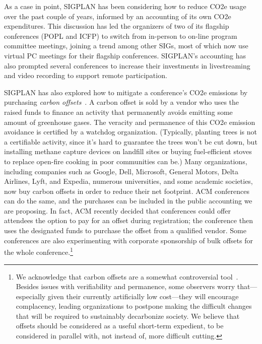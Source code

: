 \documentclass[12pt]{article}
\newcommand{\mwh}[1]{\ifdraft{\bf [mwh: #1]}\fi}
\begin{document}
As a case in point, SIGPLAN has been considering how to reduce CO2e usage
over the past couple of years, informed by an accounting of its own CO2e
expenditures. This discussion has led the organizers of two of its flagship
conferences (POPL and ICFP) to switch from in-person to on-line program
committee meetings, joining a trend among other SIGs, most of which now use
virtual PC meetings for their flagship conferences. SIGPLAN's accounting has
also prompted several conferences to increase their investments in
livestreaming and video recording to support remote participation.

SIGPLAN has also explored how to mitigate a conference's CO2e emissions by
purchasing \emph{carbon offsets}~\cite{CarbonOFfsetReport}.
%
A carbon offset is sold by a vendor who uses the raised funds to finance an
activity that permanently avoids emitting some amount of greenhouse gases.
The veracity and permanence of this CO2e emission avoidance is certified by
a watchdog organization. (Typically, planting trees is not a certifiable
activity, since it's hard to guarantee the trees won't be cut down, but
installing methane capture devices on landfill sites or buying
fuel-efficient stoves to replace open-fire cooking in poor communities can
be.)
%
Many organizations, including companies such as Google, Dell, Microsoft,
General Motors, Delta Airlines, Lyft, and Expedia, numerous universities,
and some academic societies, now buy carbon offsets in order to reduce their
net footprint. ACM conferences can do the same, and the purchases can be
included in the public accounting we are proposing.  In fact, ACM recently
decided that conferences could offer attendees the option to pay for an
offset during registration; the conference then uses the designated funds to
purchase the offset from a qualified vendor.  Some conferences are also
experimenting with corporate sponsorship of bulk offsets for the whole
conference.\footnote{We acknowledge that carbon offsets are a somewhat
  controversial 
  tool~\cite{anderson2012inconvenient,
  carbon-offsets-are-not-our-get-out-jail-free-card}.  Besides issues with
  verifiability and permanence, some observers worry that---especially given
  their currently artificially low cost---they will encourage complacency,
  leading organizations to postpone making the difficult changes that will
  be required to sustainably decarbonize society.  We believe that offsets
  should be considered as a useful short-term expedient, to be considered in
  parallel with, not instead of, more difficult cutting.} \mwh{Should
  we mention the FCRC numbers here?}
\end{document}
